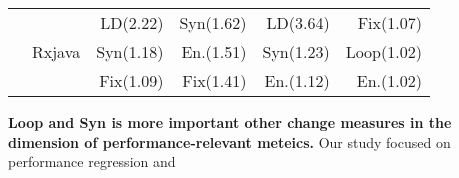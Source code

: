 \begin{table}[]
\begin{tabular}{|c|c|r|r|r|r|}
	& \multirow{3}{*}{Rxjava} & LD(2.22)                     & Syn(1.62)                & LD(3.64)                    & Fix(1.07)               \\ \cline{3-6} 
	&                         & Syn(1.18)                    & En.(1.51)                & Syn(1.23)                   & Loop(1.02)              \\ \cline{3-6} 
	&                         & Fix(1.09)                    & Fix(1.41)                & En.(1.12)                   & En.(1.02)               \\ \hline
\end{tabular}
\end{table}

\textbf{Loop and Syn is more important other change measures in the dimension of performance-relevant meteics.}
Our study focused on performance regression and 





